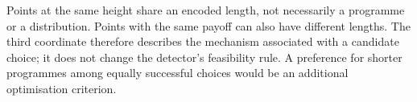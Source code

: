 \documentclass[11pt,a4paper]{article}
\begin{document}
Points at the same height share an encoded length, not necessarily a
programme or a distribution. Points with the same payoff can also have
different lengths. The third coordinate therefore describes the mechanism
associated with a candidate choice; it does not change the detector's
feasibility rule. A preference for shorter programmes among equally
successful choices would be an additional optimisation criterion.







\end{document}
